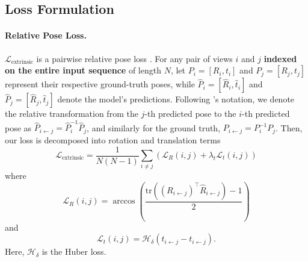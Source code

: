 \documentclass[runningheads]{llncs}
\begin{document}
\subsection{Loss Formulation}

\paragraph{\textbf{Relative Pose Loss.}}
$\mathcal{L}_{\text{extrinsic}}$ is a pairwise relative pose loss \cite{ye2025yonosplatneedmodelfeedforward}.
For any pair of views $i$ and $j$ \textbf{indexed on the entire input sequence} of length $N$, let $P_i = [R_i, t_i]$ and $P_j = [R_j, t_j]$ represent their respective ground-truth poses, while $\hat{P}_i = [\hat{R}_i, \hat{t}_i]$ and $\hat{P}_j = [\hat{R}_j, \hat{t}_j]$ denote the model's predictions.
Following \cite{ye2025yonosplatneedmodelfeedforward}'s notation, we denote the relative transformation from the $j$-th predicted pose to the $i$-th predicted pose as $\hat{P}_{i \leftarrow j} = \hat{P}_i^{-1} \hat{P}_j$, and similarly for the ground truth, $P_{i \leftarrow j} = P_i^{-1} P_j$.
Then, our loss is decomposed into rotation and translation terms
\begin{equation}
    \mathcal{L}_{\text{extrinsic}} = \frac{1}{N(N-1)} \sum_{i \neq j} \left( \mathcal{L}_R(i, j) + \lambda_t \mathcal{L}_t(i, j) \right)
\end{equation}
where
\begin{equation}
    \mathcal{L}_R(i, j) = \arccos\left(\frac{\text{tr}\left((R_{i \leftarrow j})^\top \hat{R}_{i \leftarrow j}\right) - 1}{2}\right)
\end{equation}
and
\begin{equation}
    \mathcal{L}_t(i, j) = \mathcal{H}_\delta\left(\hat{t}_{i \leftarrow j} - t_{i \leftarrow j}\right).
\end{equation}
Here, $\mathcal{H}_\delta$ is the Huber loss.
\end{document}
